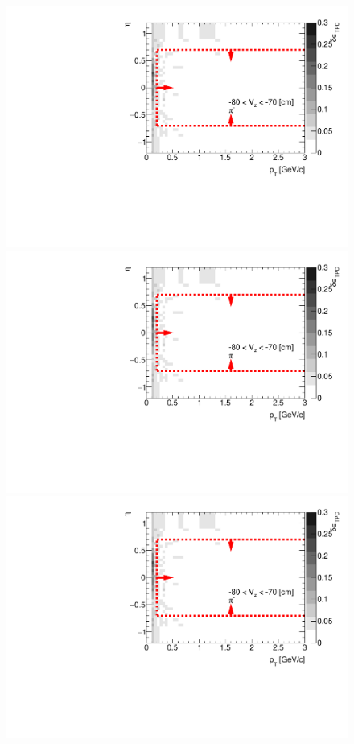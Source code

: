 \begin{figure}[H]
{	}~
	\parbox{0.325\textwidth}{
		\includegraphics[width=\linewidth,page=34]{graphics/systematicsEfficiency/deadMaterial/secondaries_Unbinned_SD_.pdf}\\
		\includegraphics[width=\linewidth,page=37]{graphics/systematicsEfficiency/deadMaterial/secondaries_Unbinned_SD_.pdf}\\
		\includegraphics[width=\linewidth,page=40]{graphics/systematicsEfficiency/deadMaterial/secondaries_Unbinned_SD_.pdf}\\
}
\end{figure}
